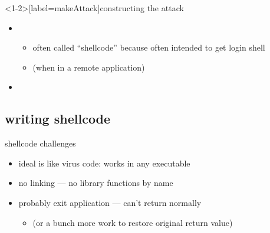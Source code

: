 \begin{frame}<1-2>[label=makeAttack]{constructing the attack}
\begin{itemize}
\item {}
    \begin{itemize}
    \item often called ``shellcode'' because often intended to get login shell
    \item (when in a remote application)
    \end{itemize}
\item {}
\end{itemize}
\end{frame}

\subsection{writing shellcode}

\begin{frame}{shellcode challenges}
\begin{itemize}
\item ideal is like virus code: works in any executable
\item no linking --- no library functions by name
\item probably exit application --- can't return normally
    \begin{itemize}
    \item (or a bunch more work to restore original return value)
    \end{itemize}
\end{itemize}
\end{frame}

